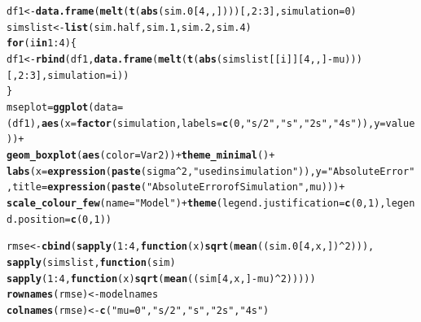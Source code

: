 \documentclass[AMA,STIX1COL]{WileyNJD-v2}\usepackage[]{graphicx}\usepackage[]{color}
\makeatletter
\newcommand{\hlnum}[1]{\textcolor[rgb]{0.686,0.059,0.569}{#1}}%
\newcommand{\hlstr}[1]{\textcolor[rgb]{0.192,0.494,0.8}{#1}}%
\newcommand{\hlopt}[1]{\textcolor[rgb]{0,0,0}{#1}}%
\newcommand{\hlstd}[1]{\textcolor[rgb]{0.345,0.345,0.345}{#1}}%
\newcommand{\hlkwa}[1]{\textcolor[rgb]{0.161,0.373,0.58}{\textbf{#1}}}%
\newcommand{\hlkwb}[1]{\textcolor[rgb]{0.69,0.353,0.396}{#1}}%
\newcommand{\hlkwc}[1]{\textcolor[rgb]{0.333,0.667,0.333}{#1}}%
\newcommand{\hlkwd}[1]{\textcolor[rgb]{0.737,0.353,0.396}{\textbf{#1}}}%
\newenvironment{kframe}{%
 \def\at@end@of@kframe{}%
 \ifinner\ifhmode%
  \def\at@end@of@kframe{\end{minipage}}%
  \begin{minipage}{\columnwidth}%
 \fi\fi%
 \def\FrameCommand##1{\hskip\@totalleftmargin \hskip-\fboxsep
 \colorbox{shadecolor}{##1}\hskip-\fboxsep
     \hskip-\linewidth \hskip-\@totalleftmargin \hskip\columnwidth}%
 \MakeFramed {\advance\hsize-\width
   \@totalleftmargin\z@ \linewidth\hsize
   \@setminipage}}%
 {\par\unskip\endMakeFramed%
 \at@end@of@kframe}
\newenvironment{knitrout}{}{} %
\makeatother
\begin{document}
\begin{knitrout}
\color{fgcolor}\begin{kframe}
\begin{alltt}
\hlstd{df1}\hlkwb{<-} \hlkwd{data.frame}\hlstd{(}\hlkwd{melt}\hlstd{(}\hlkwd{t}\hlstd{(}\hlkwd{abs}\hlstd{(sim.0[}\hlnum{4}\hlstd{,,])))[,}\hlnum{2}\hlopt{:}\hlnum{3}\hlstd{],} \hlkwc{simulation}\hlstd{=}\hlnum{0}\hlstd{)}
\hlstd{simslist}\hlkwb{<-}\hlkwd{list}\hlstd{(sim.half,sim.1,sim.2,sim.4)}
\hlkwa{for} \hlstd{(i} \hlkwa{in} \hlnum{1}\hlopt{:}\hlnum{4}\hlstd{)\{}
  \hlstd{df1}\hlkwb{<-}\hlkwd{rbind}\hlstd{(df1,}\hlkwd{data.frame}\hlstd{(}\hlkwd{melt}\hlstd{(}\hlkwd{t}\hlstd{(}\hlkwd{abs}\hlstd{(simslist[[i]][}\hlnum{4}\hlstd{,,]}\hlopt{-}\hlstd{mu)))[,}\hlnum{2}\hlopt{:}\hlnum{3}\hlstd{],} \hlkwc{simulation}\hlstd{=i))}
\hlstd{\}}
\hlstd{mseplot} \hlkwb{=} \hlkwd{ggplot}\hlstd{(}\hlkwc{data} \hlstd{= (df1),} \hlkwd{aes}\hlstd{(}\hlkwc{x}\hlstd{=}\hlkwd{factor}\hlstd{(simulation,} \hlkwc{labels}\hlstd{=}\hlkwd{c}\hlstd{(}\hlnum{0}\hlstd{,}\hlstr{"s/2"}\hlstd{,} \hlstr{"s"}\hlstd{,} \hlstr{"2s"}\hlstd{,} \hlstr{"4s"}\hlstd{)),} \hlkwc{y}\hlstd{=value))} \hlopt{+}
  \hlkwd{geom_boxplot}\hlstd{(}\hlkwd{aes}\hlstd{(}\hlkwc{color}\hlstd{=Var2))}\hlopt{+}  \hlkwd{theme_minimal}\hlstd{()} \hlopt{+}
  \hlkwd{labs}\hlstd{(}\hlkwc{x}\hlstd{=}\hlkwd{expression}\hlstd{(}\hlkwd{paste}\hlstd{(sigma}\hlopt{^}\hlnum{2}\hlstd{,} \hlstr{" used in simulation"}\hlstd{)),}\hlkwc{y}\hlstd{=}\hlstr{"Absolute Error"}\hlstd{,} \hlkwc{title}\hlstd{=}\hlkwd{expression}\hlstd{(}\hlkwd{paste}\hlstd{(}\hlstr{"Absolute Error of Simulation "}\hlstd{,mu )))}\hlopt{+}
  \hlkwd{scale_colour_few}\hlstd{(}\hlkwc{name}\hlstd{=}\hlstr{"Model"}\hlstd{)} \hlopt{+}  \hlkwd{theme}\hlstd{(} \hlkwc{legend.justification}\hlstd{=}\hlkwd{c}\hlstd{(}\hlnum{0}\hlstd{,}\hlnum{1}\hlstd{),} \hlkwc{legend.position}\hlstd{=}\hlkwd{c}\hlstd{(}\hlnum{0}\hlstd{,}\hlnum{1}\hlstd{))}


\hlstd{rmse}\hlkwb{<-} \hlkwd{cbind}\hlstd{(}\hlkwd{sapply}\hlstd{(}\hlnum{1}\hlopt{:}\hlnum{4}\hlstd{,} \hlkwa{function}\hlstd{(}\hlkwc{x}\hlstd{)} \hlkwd{sqrt}\hlstd{(}\hlkwd{mean}\hlstd{((sim.0[}\hlnum{4}\hlstd{,x,])}\hlopt{^}\hlnum{2}\hlstd{))),}
             \hlkwd{sapply}\hlstd{(simslist,} \hlkwa{function}\hlstd{(}\hlkwc{sim}\hlstd{)}
               \hlkwd{sapply}\hlstd{(}\hlnum{1}\hlopt{:}\hlnum{4}\hlstd{,} \hlkwa{function}\hlstd{(}\hlkwc{x}\hlstd{)} \hlkwd{sqrt}\hlstd{(}\hlkwd{mean}\hlstd{((sim[}\hlnum{4}\hlstd{,x,]}\hlopt{-}\hlstd{mu)}\hlopt{^}\hlnum{2}\hlstd{)))))}
\hlkwd{rownames}\hlstd{(rmse)}\hlkwb{<-}\hlstd{modelnames}
\hlkwd{colnames}\hlstd{(rmse)}\hlkwb{<-}\hlkwd{c}\hlstd{(}\hlstr{"mu=0"}\hlstd{,}\hlstr{"s/2"}\hlstd{,} \hlstr{"s"}\hlstd{,} \hlstr{"2s"}\hlstd{,} \hlstr{"4s"}\hlstd{)}



\end{alltt}
\end{kframe}
\end{knitrout}
\end{document}
